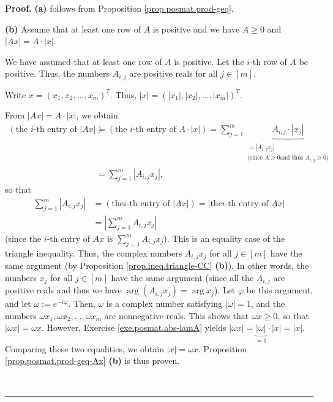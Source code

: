 \documentclass[numbers=enddot,12pt,final,onecolumn,notitlepage]{scrartcl}%
\numberwithin{exer}{subsection}
\theoremstyle{definition}
\newenvironment{proof}[1][Proof]{\noindent\textbf{#1.} }{\ \rule{0.5em}{0.5em}}
\let\sumnonlimits\sum
\renewcommand{\sum}{\sumnonlimits\limits}
\begin{document}
\begin{proof}
\textbf{(a)} follows from Proposition \ref{prop.posmat.prod-geq}. \medskip

\textbf{(b)} Assume that at least one row of $A$ is positive and we have
$A\geq0$ and $\left\vert Ax\right\vert =A\cdot\left\vert x\right\vert $.

We have assumed that at least one row of $A$ is positive. Let the $i$-th row
of $A$ be positive. Thus, the numbers $A_{i,j}$ are positive reals for all
$j\in\left[  m\right]  $.

Write $x=\left(  x_{1},x_{2},\ldots,x_{m}\right)  ^{T}$. Thus, $\left\vert
x\right\vert =\left(  \left\vert x_{1}\right\vert ,\left\vert x_{2}\right\vert
,\ldots,\left\vert x_{m}\right\vert \right)  ^{T}$.

From $\left\vert Ax\right\vert =A\cdot\left\vert x\right\vert $, we obtain%
\begin{align*}
\left(  \text{the }i\text{-th entry of }\left\vert Ax\right\vert \right)   &
=\left(  \text{the }i\text{-th entry of }A\cdot\left\vert x\right\vert
\right)  =\sum_{j=1}^{m}\underbrace{A_{i,j}\cdot\left\vert x_{j}\right\vert
}_{\substack{=\left\vert A_{i,j}x_{j}\right\vert \\\text{(since }A\geq0\text{
and thus }A_{i,j}\geq0\text{)}}}\\
&  =\sum_{j=1}^{m}\left\vert A_{i,j}x_{j}\right\vert ,
\end{align*}
so that
\begin{align*}
\sum_{j=1}^{m}\left\vert A_{i,j}x_{j}\right\vert  &  =\left(  \text{the
}i\text{-th entry of }\left\vert Ax\right\vert \right)  =\left\vert \text{the
}i\text{-th entry of }Ax\right\vert \\
&  =\left\vert \sum_{j=1}^{m}A_{i,j}x_{j}\right\vert
\end{align*}
(since the $i$-th entry of $Ax$ is $\sum_{j=1}^{m}A_{i,j}x_{j}$). This is an
equality case of the triangle inequality. Thus, the complex numbers
$A_{i,j}x_{j}$ for all $j\in\left[  m\right]  $ have the same argument (by
Proposition \ref{prop.ineq.triangle-CC} \textbf{(b)}). In other words, the
numbers $x_{j}$ for all $j\in\left[  m\right]  $ have the same argument (since
all the $A_{i,j}$ are positive reals and thus we have $\arg\left(
A_{i,j}x_{j}\right)  =\arg x_{j}$). Let $\varphi$ be this argument, and let
$\omega:=e^{-i\varphi}$. Then, $\omega$ is a complex number satisfying
$\left\vert \omega\right\vert =1$, and the numbers $\omega x_{1},\omega
x_{2},\ldots,\omega x_{m}$ are nonnegative reals. This shows that $\omega
x\geq0$, so that $\left\vert \omega x\right\vert =\omega x$. However, Exercise
\ref{exe.posmat.abs-lamA} yields $\left\vert \omega x\right\vert
=\underbrace{\left\vert \omega\right\vert }_{=1}\cdot\left\vert x\right\vert
=\left\vert x\right\vert $. Comparing these two equalities, we obtain
$\left\vert x\right\vert =\omega x$. Proposition \ref{prop.posmat.prod-geq-Ax}
\textbf{(b)} is thus proven. \medskip


\end{proof}
\end{document}
